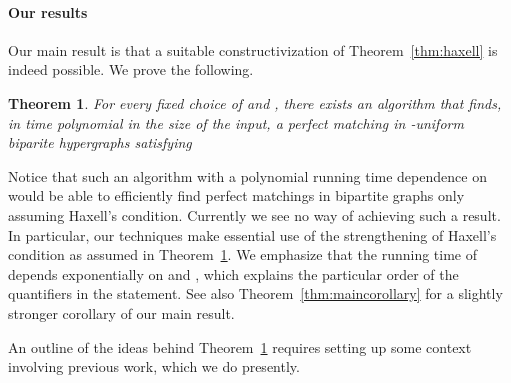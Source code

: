 \documentclass[11pt]{article}
\newtheorem{theorem}{Theorem}[section]
\theoremstyle{definition}
\theoremstyle{remark}
\begin{document}
\paragraph{Our results} Our main result is that a suitable
constructivization of Theorem~\ref{thm:haxell} is indeed possible. We
prove the following.

\begin{theorem}\label{thm:main}
  For every fixed choice of  and , there exists
  an algorithm  that finds, in time
  polynomial in the size of the input, a perfect matching in
  -uniform biparite hypergraphs  satisfying
  
\end{theorem}



Notice that such an algorithm with a polynomial running time
dependence on  would be able to efficiently find perfect
matchings in bipartite graphs only assuming Haxell's
condition. Currently we see no way of achieving such a result. In
particular, our techniques make essential use of the 
strengthening of Haxell's condition as assumed in
Theorem~\ref{thm:main}. We emphasize that the running time of
 depends exponentially on  and , which
explains the particular order of the quantifiers in the statement. See
also Theorem~\ref{thm:maincorollary} for a slightly stronger corollary of
our main result.

An outline of the ideas behind Theorem~\ref{thm:main} requires setting
up some context involving previous work, which we do presently.
\end{document}
